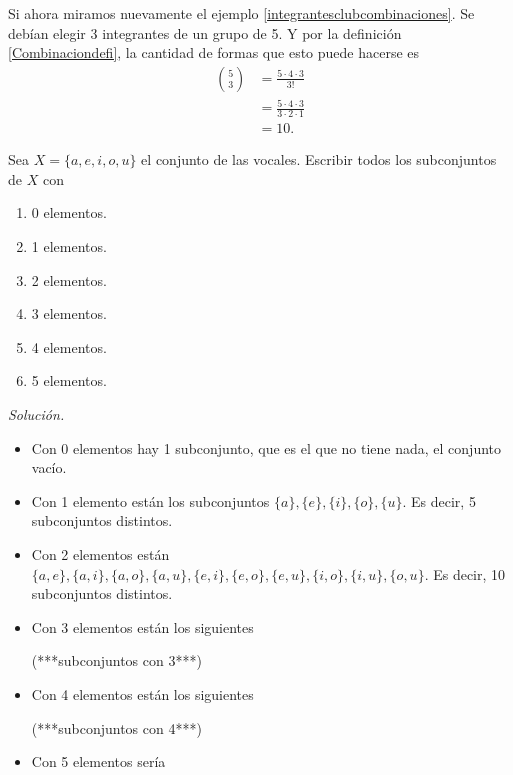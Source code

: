 Si ahora miramos nuevamente el ejemplo \ref{integrantesclubcombinaciones}. Se debían elegir 3 integrantes de un grupo de 5. Y por la definición \ref{Combinaciondefi}, la cantidad de formas que esto puede hacerse es 
\begin{equation*}
    \begin{split}
        \binom{5}{3} & = \frac{5\cdot 4\cdot 3}{3!}\\
                     & = \frac{5\cdot 4\cdot 3}{3\cdot 2\cdot 1}\\
                     & = 10.
    \end{split}
\end{equation*}

\begin{ejemplo}
Sea $X=\{ a,e,i,o,u \}$ el conjunto de las vocales. Escribir todos los subconjuntos de $X$ con 
    \begin{enumerate}[label=\Roman* )]
        \item 0 elementos.
        \item 1 elementos.
        \item 2 elementos.
        \item 3 elementos.
        \item 4 elementos.
        \item 5 elementos.
    \end{enumerate}
\end{ejemplo}
\vspace{0.3cm}

\textit{Solución. }\\

    \begin{itemize}
        \item Con 0 elementos hay 1 subconjunto, que es el que no tiene nada, el conjunto vacío.
        \item Con 1 elemento están los subconjuntos $\{ a\},\{ e\},\{ i\},\{ o\},\{ u\}$.
            Es decir, 5 subconjuntos distintos. 
        \item Con 2 elementos están $\{ a,e\},\{ a,i\},\{ a,o\},\{ a,u\},\{ e,i\},\{ e,o\},\{ e,u\},\{ i,o\},\{ i,u\},\{ o,u\}$. Es decir, 10 subconjuntos distintos. 
        \item Con 3 elementos están los siguientes 
                \vspace{2cm}

                    (***subconjuntos con 3***)

                \vspace{2cm}
        \item Con 4 elementos están los siguientes 
                \vspace{2cm}

                    (***subconjuntos con 4***)

                \vspace{2cm}
        \item Con 5 elementos sería  
                
    \end{itemize}
    
